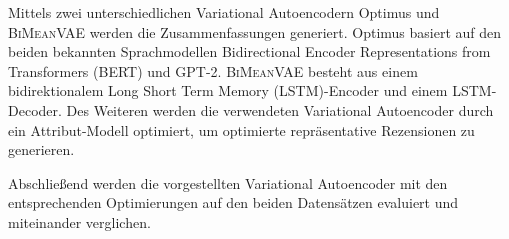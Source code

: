 Mittels zwei unterschiedlichen Variational Autoencodern Optimus und \textsc{BiMeanVAE} werden die Zusammenfassungen generiert.
Optimus basiert auf den beiden bekannten Sprachmodellen Bidirectional Encoder Representations from Transformers (BERT) und GPT-2. 
\textsc{BiMeanVAE} besteht aus einem bidirektionalem Long Short Term Memory (LSTM)-Encoder und einem LSTM-Decoder.
Des Weiteren werden die verwendeten Variational Autoencoder durch ein Attribut-Modell optimiert, um optimierte repräsentative Rezensionen zu generieren.

Abschließend werden die vorgestellten Variational Autoencoder mit den entsprechenden Optimierungen auf den beiden Datensätzen evaluiert und miteinander verglichen.












